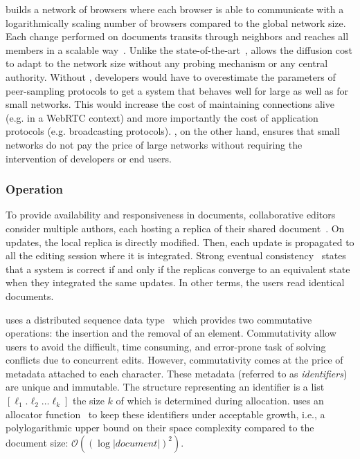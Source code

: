 \CRATE builds a network of browsers where each browser is able to
communicate with a logarithmically scaling number of browsers compared
to the global network size. Each change performed on documents
transits through neighbors and reaches all members in a scalable
way~\cite{birman1999bimodal}. Unlike the
state-of-the-art~\cite{tolgyeski2009adaptive,voulgaris2005cyclon},
\SPRAY allows the diffusion cost to adapt to the network size without
any probing mechanism or any central authority.  Without \SPRAY,
developers would have to overestimate the parameters of peer-sampling
protocols to get a system that behaves well for large as well as for
small networks. This would increase the cost of maintaining
connections alive (e.g. in a WebRTC context) and more importantly the
cost of application protocols (e.g. broadcasting protocols).  \SPRAY,
on the other hand, ensures that small networks do not pay the price of
large networks without requiring the intervention of developers or
end users. 

\subsubsection{Operation}

To provide availability and responsiveness in documents, collaborative
editors consider multiple authors, each hosting a replica of their
shared document~\cite{saito2005optimistic}.  On updates, the local
replica is directly modified. Then, each update is propagated to all
the editing session where it is integrated. Strong eventual
consistency~\cite{bailis2013eventual} states that a system is correct
if and only if the replicas converge to an equivalent state when they
integrated the same updates. In other terms, the users read identical
documents.

\CRATE uses a distributed sequence data type~\cite{shapiro2011conflict} which
provides two commutative operations: the insertion and the removal of an
element. Commutativity allow users to avoid the difficult, time consuming, and
error-prone task of solving conflicts due to concurrent edits. However,
commutativity comes at the price of metadata attached to each character. These
metadata (referred to as \emph{identifiers}) are unique and immutable. The
structure representing an identifier is a list $[\ell_1.\ell_2\ldots\ell_k]$ the
size $k$ of which is determined during allocation. \CRATE uses an allocator
function~\cite{nedelec2013lseq} to keep these identifiers under acceptable
growth, i.e., a polylogarithmic upper bound on their space complexity compared
to the document size: $\mathcal{O}((\log |document|)^2)$.

